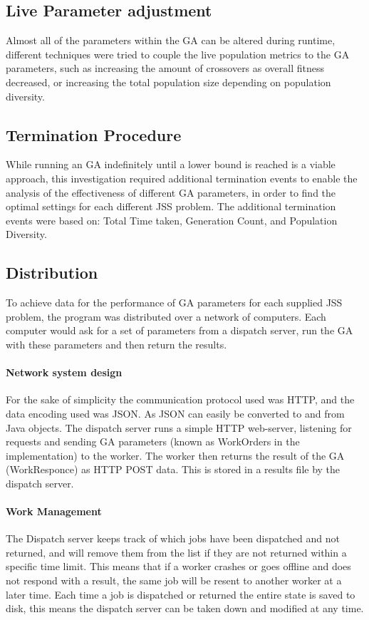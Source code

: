 \documentclass[14pt]{acmsiggraph}
\begin{document}
\subsection{Live Parameter adjustment}
Almost all of the parameters within the GA can be altered during runtime, different techniques were tried to couple the live population metrics to the GA parameters, such as increasing the amount of crossovers as overall fitness decreased, or increasing the total population size depending on population diversity.

\subsection{Termination Procedure}
While running an GA indefinitely until a lower bound is reached is a viable approach, this investigation required additional termination events to enable the analysis of the effectiveness of different GA parameters, in order to find the optimal settings for each different JSS problem. The additional termination events were based on: Total Time taken, Generation Count, and Population Diversity.

\subsection{Distribution}
To achieve data for the performance of GA parameters for each supplied JSS problem, the program was distributed over a network of computers. Each computer would ask for a set of parameters from a dispatch server, run the GA with these parameters and then return the results.

\paragraph{Network system design}
For the sake of simplicity the communication protocol used was HTTP, and the data encoding used was JSON. As JSON can easily be converted to and from Java objects. The dispatch server runs a simple HTTP web-server, listening for requests and sending GA parameters (known as WorkOrders in the implementation) to the worker. The worker then returns the result of the GA (WorkResponce) as HTTP POST data. This is stored in a results file by the dispatch server. 

\paragraph{Work Management}
The Dispatch server keeps track of which jobs have been dispatched and not returned, and will remove them from the list if they are not returned within a specific time limit. This means that if a worker crashes or goes offline and does not respond with a result, the same job will be resent to another worker at a later time. Each time a job is dispatched or returned the entire state is saved to disk, this means the dispatch server can be taken down and modified at any time.
\end{document}
